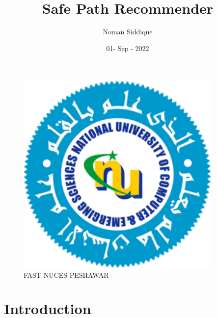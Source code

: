 \documentclass[12 pt,letterpaper]{article}
\begin{document}
\begin{figure}
    \centering
    \includegraphics[width=0.9\textwidth]{logo.png}
    \caption{FAST NUCES PESHAWAR}
    
\end{figure}


\title{Safe Path Recommender}
\author{Noman Siddique}
\date{01- Sep - 2022 }


\maketitle

\section*{Introduction}
\end{document}
